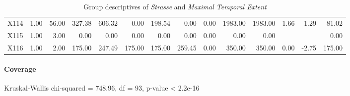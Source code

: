 \begin{table}[ht!]
\begin{tabular}{rrrrrrrrrrrrrr}
    X114 & 1.00 & 56.00 & 327.38 & 606.32 & 0.00 & 198.54 & 0.00 & 0.00 & 1983.00 & 1983.00 & 1.66 & 1.29 & 81.02 \\ 
    X115 & 1.00 & 3.00 & 0.00 & 0.00 & 0.00 & 0.00 & 0.00 & 0.00 & 0.00 & 0.00 &  &  & 0.00 \\ 
    X116 & 1.00 & 2.00 & 175.00 & 247.49 & 175.00 & 175.00 & 259.45 & 0.00 & 350.00 & 350.00 & 0.00 & -2.75 & 175.00 \\ 
     \hline
  \end{tabular}
	\caption{Group descriptives of \textit{Strasse} and \textit{Maximal Temporal Extent}}
	\label{tbl:descriptives_baysis_matched_Strasse_TMax}
\end{table}

\paragraph{Coverage}
Kruskal-Wallis chi-squared = 748.96, df = 93, p-value < 2.2e-16

